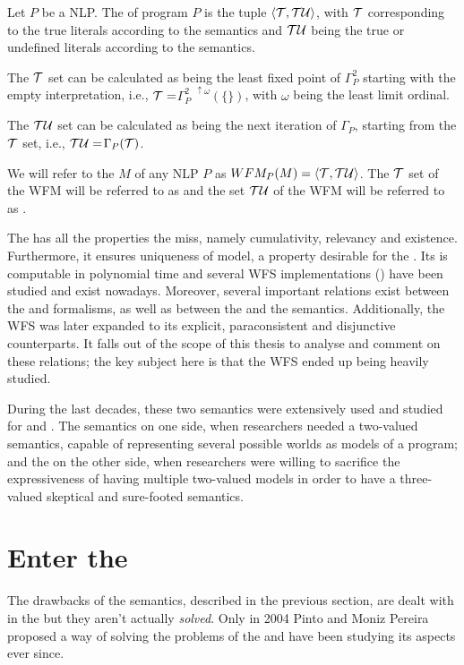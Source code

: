 \begin{definition}[\WFS]
Let $P$ be a NLP. The \WFS of program $P$ is the tuple $\left\langle \cal{T},\cal{TU} \right\rangle$, with $\cal{T}$ corresponding to the true literals according to the semantics and $\cal{TU}$ being the true or undefined literals according to the semantics.

The $\cal{T}$ set can be calculated as being the least fixed point of $\Gamma_{P}^{2}$ starting with the empty interpretation, i.e., $\cal{T}=$$\Gamma_{P}^{2\text{ }\uparrow \omega}(\{\})$, with $\omega$ being the least limit ordinal.

The $\cal{TU}$ set can be calculated as being the next iteration of $\Gamma_{P}$, starting from the $\cal{T}$ set, i.e., $\cal{TU}=$$\Gamma_{P}(\cal{T})$.

We will refer to the \wfm $M$ of any NLP $P$ as $WFM_{P}(M)=\langle\cal{T},\cal{TU}\rangle$. The $\cal{T}$ set of the WFM will be referred to as \tWFM and the set $\cal{TU}$ of the WFM will be referred to as \tuWFM.
\end{definition}

The \wfs has all the properties the \sms miss, namely cumulativity, relevancy and existence. Furthermore, it ensures uniqueness of model, a property desirable for the \wfs. Its \wfm is computable in polynomial time and several WFS implementations (\cite{xsbSite,xsbArticle,branchBound,alternatingFixpoint}) have been studied and exist nowadays. Moreover, several important relations exist between the \wfs and \nmr formalisms\cite{wfsDualities,wfsGeneralized}, as well as between the \wfs and the \sms semantics\cite{wfsCoincides,wfsRelation}. Additionally, the WFS was later expanded to its explicit\cite{jjaPhD,wfsxArticle}, paraconsistent\cite{paraconsistentArticle} and disjunctive\cite{alcantaraPhD} counterparts. It falls out of the scope of this thesis to analyse and comment on these relations; the key subject here is that the WFS ended up being heavily studied.

During the last decades, these two semantics were extensively used and studied for \nmr and \kr. The \sms semantics on one side, when researchers needed a two-valued semantics, capable of representing several possible worlds as models of a program; and the \wfs on the other side, when researchers were willing to sacrifice the expressiveness of having multiple two-valued models in order to have a three-valued skeptical and sure-footed semantics.


\section{Enter the \RSMs}
The drawbacks of the \sms semantics, described in the previous section, are dealt with in the \wfs but they aren't actually \emph{solved}. Only in 2004 Pinto and Moniz Pereira proposed\cite{rsmItaly} a way of solving the problems of the \sms and have been studying\cite{ampMSc,rsmEpia,rsmItaly} its aspects ever since.

